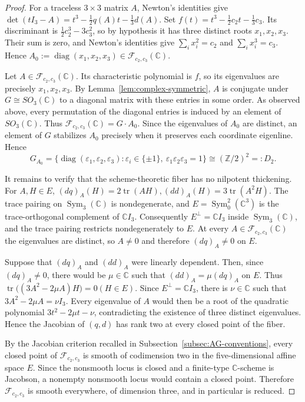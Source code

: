 \documentclass[10pt,a4paper]{amsart}
\numberwithin{equation}{section} \newtheorem{thm}{Theorem}[section] \newtheorem{lem}[thm]{Lemma} \newtheorem{ex}[thm]{Example} \newtheorem{prop}[thm]{Proposition} \newtheorem{cor}[thm]{Corollary} \newtheorem{defi}[thm]{Definition} \newtheorem{rmk}[thm]{Remark} \newtheorem{notation}[thm]{Notation}
\newcommand{\Sym}{\operatorname{Sym}}
\def\Z{\mathbb{Z}} \def\N{\mathbb{N}} \def\A{\mathbb{A}} \def\C{\mathbb{C}} \def\R{\mathbb{R}} \def\Q{\mathbb{Q}} \def\F{\mathbb{F}}
\begin{document}
\begin{proof}
For a traceless $3\times3$ matrix $A$, Newton's identities give \(\det(tI_3-A) =t^3-\frac12q(A)t-\frac13d(A)\). Set \(f(t)=t^3-\frac12c_2t-\frac13c_3.\) Its discriminant is \(\frac12c_2^3-3c_3^2\), so by hypothesis it has three distinct roots $x_1,x_2,x_3$. Their sum is zero, and Newton's identities give \(\sum_i x_i^2=c_2\) and \(\sum_i x_i^3=c_3\). Hence \(A_0:=\operatorname{diag}(x_1,x_2,x_3)\in \mathcal F_{c_2,c_3}(\C).\)

Let $A\in\mathcal F_{c_2,c_3}(\C)$. Its characteristic polynomial is $f$, so its eigenvalues are precisely $x_1,x_2,x_3$. By Lemma~\ref{lem:complex-symmetric}, $A$ is conjugate under $G\cong SO_3(\C)$ to a diagonal matrix with these entries in some order. As observed above, every permutation of the diagonal entries is induced by an element of $SO_3(\C)$. Thus \(\mathcal F_{c_2,c_3}(\C)=G\cdot A_0.\) Since the eigenvalues of $A_0$ are distinct, an element of $G$ stabilizes $A_0$ precisely when it preserves each coordinate eigenline. Hence
\[
G_{A_0}
 =\{\operatorname{diag}(\varepsilon_1,\varepsilon_2,\varepsilon_3):
   \varepsilon_i\in\{\pm1\},\
   \varepsilon_1\varepsilon_2\varepsilon_3=1\}
 \cong(\Z/2)^2=:D_2.
\]

It remains to verify that the scheme-theoretic fiber has no nilpotent thickening. For $A,H\in E$, \((dq)_A(H)=2\operatorname{tr}(AH), (dd)_A(H)=3\operatorname{tr}(A^2H).\) The trace pairing on $\Sym_3(\C)$ is nondegenerate, and $E=\Sym^2_0(\C^3)$ is the trace-orthogonal complement of $\C I_3$. Consequently \(E^\perp=\C I_3\) inside $\Sym_3(\C)$, and the trace pairing restricts nondegenerately to $E$. At every $A\in\mathcal F_{c_2,c_3}(\C)$ the eigenvalues are distinct, so $A\ne0$ and therefore $(dq)_A\ne0$ on $E$.

Suppose that $(dq)_A$ and $(dd)_A$ were linearly dependent. Then, since $(dq)_A\ne0$, there would be $\mu\in\C$ such that $(dd)_A=\mu(dq)_A$ on $E$. Thus \(\operatorname{tr}\bigl((3A^2-2\mu A)H\bigr)=0 (H\in E).\) Since $E^\perp=\C I_3$, there is $\nu\in\C$ such that \(3A^2-2\mu A=\nu I_3.\) Every eigenvalue of $A$ would then be a root of the quadratic polynomial \(3t^2-2\mu t-\nu\), contradicting the existence of three distinct eigenvalues. Hence the Jacobian of $(q,d)$ has rank two at every closed point of the fiber.

By the Jacobian criterion recalled in Subsection~\ref{subsec:AG-conventions}, every closed point of $\mathcal F_{c_2,c_3}$ is smooth of codimension two in the five-dimensional affine space $E$. Since the nonsmooth locus is closed and a finite-type $\C$-scheme is Jacobson, a nonempty nonsmooth locus would contain a closed point. Therefore $\mathcal F_{c_2,c_3}$ is smooth everywhere, of dimension three, and in particular is reduced.


\end{proof}
\end{document}
